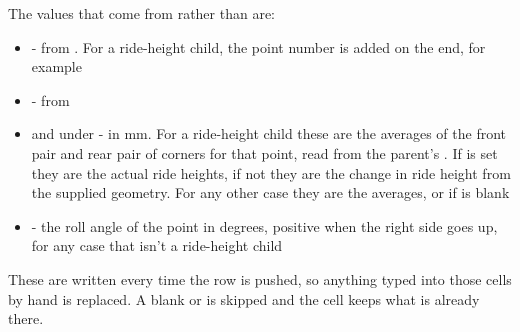 The values that come from  rather than  are:
\begin{itemize}
    \item {} -  from \codeword{[TITLES]}. For a ride-height child, the point number is added on the end, for example 
    \item {} -  from \codeword{[TITLES]}
    \item {} and  under  - in mm. For a ride-height child these are the averages of the front pair and rear pair of corners for that point, read from the parent's . If  is set they are the actual ride heights, if not they are the change in ride height from the supplied geometry. For any other case they are the  averages, or  if  is blank
    \item {} - the roll angle of the point in degrees, positive when the right side goes up,  for any case that isn't a ride-height child
\end{itemize}
These are written every time the row is pushed, so anything typed into those cells by hand is replaced. A blank  or  is skipped and the cell keeps what is already there.
